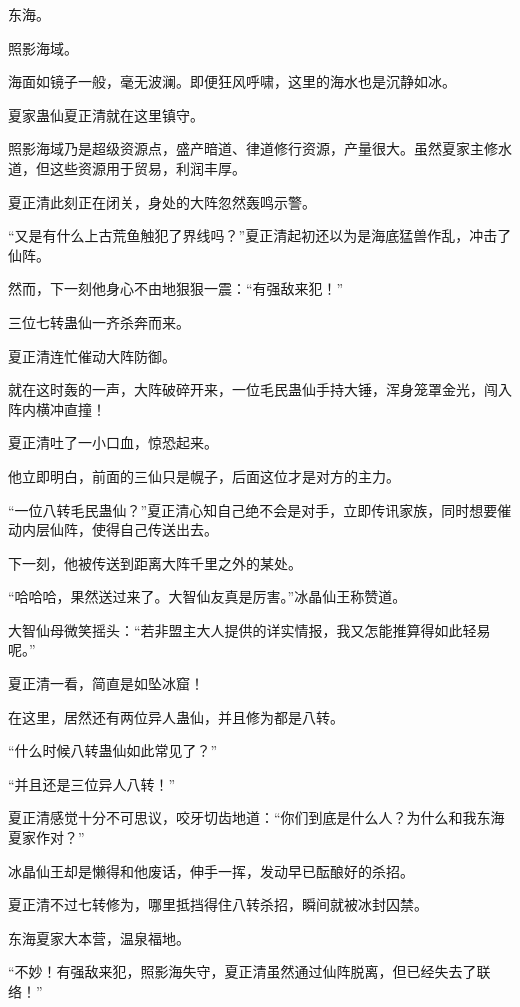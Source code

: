 
\begin{this_body}

东海。

照影海域。

海面如镜子一般，毫无波澜。即便狂风呼啸，这里的海水也是沉静如冰。

夏家蛊仙夏正清就在这里镇守。

照影海域乃是超级资源点，盛产暗道、律道修行资源，产量很大。虽然夏家主修水道，但这些资源用于贸易，利润丰厚。

夏正清此刻正在闭关，身处的大阵忽然轰鸣示警。

“又是有什么上古荒鱼触犯了界线吗？”夏正清起初还以为是海底猛兽作乱，冲击了仙阵。

然而，下一刻他身心不由地狠狠一震：“有强敌来犯！”

三位七转蛊仙一齐杀奔而来。

夏正清连忙催动大阵防御。

就在这时轰的一声，大阵破碎开来，一位毛民蛊仙手持大锤，浑身笼罩金光，闯入阵内横冲直撞！

夏正清吐了一小口血，惊恐起来。

他立即明白，前面的三仙只是幌子，后面这位才是对方的主力。

“一位八转毛民蛊仙？”夏正清心知自己绝不会是对手，立即传讯家族，同时想要催动内层仙阵，使得自己传送出去。

下一刻，他被传送到距离大阵千里之外的某处。

“哈哈哈，果然送过来了。大智仙友真是厉害。”冰晶仙王称赞道。

大智仙母微笑摇头：“若非盟主大人提供的详实情报，我又怎能推算得如此轻易呢。”

夏正清一看，简直是如坠冰窟！

在这里，居然还有两位异人蛊仙，并且修为都是八转。

“什么时候八转蛊仙如此常见了？”

“并且还是三位异人八转！”

夏正清感觉十分不可思议，咬牙切齿地道：“你们到底是什么人？为什么和我东海夏家作对？”

冰晶仙王却是懒得和他废话，伸手一挥，发动早已酝酿好的杀招。

夏正清不过七转修为，哪里抵挡得住八转杀招，瞬间就被冰封囚禁。

东海夏家大本营，温泉福地。

“不妙！有强敌来犯，照影海失守，夏正清虽然通过仙阵脱离，但已经失去了联络！”


\end{this_body}
